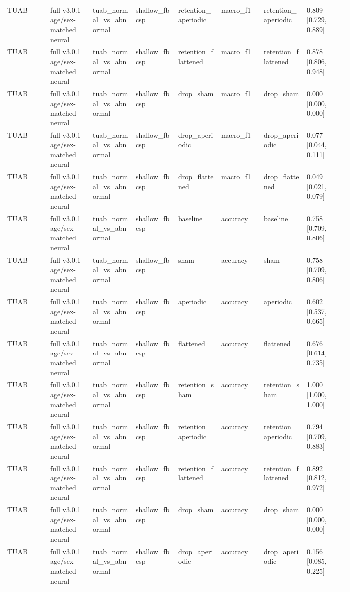 \begin{longtable}{p{0.10\linewidth}p{0.10\linewidth}p{0.10\linewidth}p{0.10\linewidth}p{0.10\linewidth}p{0.10\linewidth}p{0.10\linewidth}p{0.10\linewidth}}
TUAB & full v3.0.1 age/sex-matched neural & tuab\_normal\_vs\_abnormal & shallow\_fbcsp & retention\_aperiodic & macro\_f1 & retention\_aperiodic & 0.809 [0.729, 0.889]\\
TUAB & full v3.0.1 age/sex-matched neural & tuab\_normal\_vs\_abnormal & shallow\_fbcsp & retention\_flattened & macro\_f1 & retention\_flattened & 0.878 [0.806, 0.948]\\
TUAB & full v3.0.1 age/sex-matched neural & tuab\_normal\_vs\_abnormal & shallow\_fbcsp & drop\_sham & macro\_f1 & drop\_sham & 0.000 [0.000, 0.000]\\
TUAB & full v3.0.1 age/sex-matched neural & tuab\_normal\_vs\_abnormal & shallow\_fbcsp & drop\_aperiodic & macro\_f1 & drop\_aperiodic & 0.077 [0.044, 0.111]\\
TUAB & full v3.0.1 age/sex-matched neural & tuab\_normal\_vs\_abnormal & shallow\_fbcsp & drop\_flattened & macro\_f1 & drop\_flattened & 0.049 [0.021, 0.079]\\
TUAB & full v3.0.1 age/sex-matched neural & tuab\_normal\_vs\_abnormal & shallow\_fbcsp & baseline & accuracy & baseline & 0.758 [0.709, 0.806]\\
TUAB & full v3.0.1 age/sex-matched neural & tuab\_normal\_vs\_abnormal & shallow\_fbcsp & sham & accuracy & sham & 0.758 [0.709, 0.806]\\
TUAB & full v3.0.1 age/sex-matched neural & tuab\_normal\_vs\_abnormal & shallow\_fbcsp & aperiodic & accuracy & aperiodic & 0.602 [0.537, 0.665]\\
TUAB & full v3.0.1 age/sex-matched neural & tuab\_normal\_vs\_abnormal & shallow\_fbcsp & flattened & accuracy & flattened & 0.676 [0.614, 0.735]\\
TUAB & full v3.0.1 age/sex-matched neural & tuab\_normal\_vs\_abnormal & shallow\_fbcsp & retention\_sham & accuracy & retention\_sham & 1.000 [1.000, 1.000]\\
TUAB & full v3.0.1 age/sex-matched neural & tuab\_normal\_vs\_abnormal & shallow\_fbcsp & retention\_aperiodic & accuracy & retention\_aperiodic & 0.794 [0.709, 0.883]\\
TUAB & full v3.0.1 age/sex-matched neural & tuab\_normal\_vs\_abnormal & shallow\_fbcsp & retention\_flattened & accuracy & retention\_flattened & 0.892 [0.812, 0.972]\\
TUAB & full v3.0.1 age/sex-matched neural & tuab\_normal\_vs\_abnormal & shallow\_fbcsp & drop\_sham & accuracy & drop\_sham & 0.000 [0.000, 0.000]\\
TUAB & full v3.0.1 age/sex-matched neural & tuab\_normal\_vs\_abnormal & shallow\_fbcsp & drop\_aperiodic & accuracy & drop\_aperiodic & 0.156 [0.085, 0.225]\\

\end{longtable}
